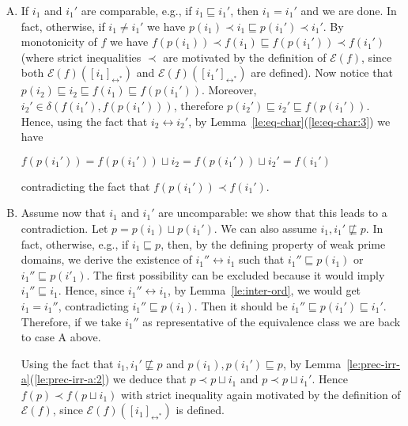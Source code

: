 \documentclass[conference]{IEEEtran}
\renewenvironment{proof}{\begin{IEEEproof}}{\end{IEEEproof}}
\newcommand{\diff}[2]{\ensuremath{\delta({#1},{#2})}}
\newcommand{\pred}[1]{\ensuremath{\mathit{p}({#1})}}
\newcommand{\eqclass}[2][]{\ensuremath{[{#2}]_{\scriptscriptstyle {#1}}}}
\newcommand{\eqclassir}[1]{\ensuremath{\eqclass[\leftrightarrow^*]{#1}}}
\newcommand{\zev}[0]{\ensuremath{\mathcal{E}}}
\newcommand{\ev}[1]{\ensuremath{\zev({#1})}}
\begin{document}
\begin{proof}
\begin{itemize}
    \begin{enumerate}[A.]
    \item If $i_1$ and $i_1'$ are comparable, e.g.,
      if $i_1 \sqsubseteq i_1'$, then $i_1 = i_1'$ and we are
      done. In fact, otherwise, if $i_1 \neq i_1'$ we have
      $\pred{i_1} \prec i_1 \sqsubseteq \pred{i_1'} \prec i_1'$.  By
      monotonicity of $f$ we have
      $f(\pred{i_1}) \prec f(i_1) \sqsubseteq f(\pred{i_1'}) \prec
      f(i_1')$
      (where strict inequalities $\prec$  are motivated by the 
      definition of $\ev{f}$, since
      both $\ev{f}(\eqclassir{i_1})$ and $\ev{f}(\eqclassir{i_1'})$
      are defined).
      Now notice that
      $\pred{i_2} \sqsubseteq i_2 \sqsubseteq f(i_1) \sqsubseteq
      f(\pred{i_1'})$. Moreover,
      $i_2' \in \diff{f(i_1')}{f(\pred{i_1'})}$, therefore
      $\pred{i_2'} \sqsubseteq i_2' \sqsubseteq f(\pred{i_1'})$.
      Hence, using the fact that $i_2 \leftrightarrow i_2'$, by
      Lemma~\ref{le:eq-char}(\ref{le:eq-char:3}) we have
      \begin{center}
        $f(\pred{i_1'}) = f(\pred{i_1'}) \sqcup i_2 = f(\pred{i_1'})
        \sqcup i_2' = f(i_1')$
      \end{center}
      contradicting  the fact that $f(\pred{i_1'}) \prec f(i_1')$.
    
      \smallskip
      
    \item Assume now that $i_1$ and $i_1'$ are uncomparable{: we show that this leads to a contradiction.}   Let 
      $p = \pred{i_1} \sqcup \pred{i_1'}$. We can also assume
      $i_1, i_1' \not\sqsubseteq p$. In fact, otherwise, e.g., if
      $i_1 \sqsubseteq p$, then, by the defining property of weak
      prime domains, we derive the existence of
      $i_1'' \leftrightarrow i_1$ such that
      $i_1'' \sqsubseteq \pred{i_1}$ or
      $i_1'' \sqsubseteq \pred{i'_1}$. The first possibility can be
      excluded because it would imply $i_1'' \sqsubseteq i_1$. Hence,
      since $i_1'' \leftrightarrow i_1$, by
      Lemma~\ref{le:inter-ord}, we would get $i_1=i_1''$,
      contradicting $i_1'' \sqsubseteq \pred{i_1}$. Then it should be
      $i_1'' \sqsubseteq \pred{i_1'} \sqsubseteq i_1'$. Therefore, if
      we take $i_1''$ as representative of the equivalence class we
      are back to case A above.

      Using the fact that $i_1, i_1' \not\sqsubseteq p$ and
      $\pred{i_1}, \pred{i_1'} \sqsubseteq p$, by
      Lemma~\ref{le:prec-irr-a}(\ref{le:prec-irr-a:2}) we deduce that
      $p \prec p \sqcup i_1$ and $p \prec p \sqcup i_1'$.
      Hence $f(p) \prec f(p \sqcup i_1)$ with strict inequality again
      motivated by the definition of $\ev{f}$, since
      $\ev{f}(\eqclassir{i_1})$ is defined.


\end{enumerate}
\end{itemize}
\end{proof}
\end{document}
